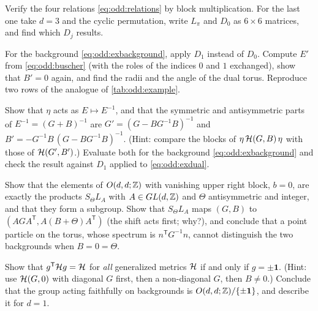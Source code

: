 \begin{exercise}\label{ex:odd:relations}
Verify the four relations \eqref{eq:odd:relations} by block multiplication. For the last
one take $d=3$ and the cyclic permutation, write $L_\pi$ and $D_0$ as $6\times6$
matrices, and find which $D_j$ results.
\end{exercise}

\begin{exercise}\label{ex:odd:table}
For the background \eqref{eq:odd:exbackground}, apply $D_1$ instead of $D_0$. Compute $E'$
from \eqref{eq:odd:buscher} (with the roles of the indices $0$ and $1$ exchanged), show
that $B'=0$ again, and find the radii and the angle of the dual torus. Reproduce two rows
of the analogue of \cref{tab:odd:example}.
\end{exercise}

\begin{exercise}\label{ex:odd:Einv}
Show that $\eta$ acts as $E\mapsto E^{-1}$, and that the symmetric and antisymmetric parts
of $E^{-1}=(G+B)^{-1}$ are $G'=(G-BG^{-1}B)^{-1}$ and $B'=-G^{-1}B\,(G-BG^{-1}B)^{-1}$.
(Hint: compare the blocks of $\eta\,\mathcal{H}(G,B)\,\eta$ with those of $\mathcal{H}(G',B')$.) Evaluate
both for the background \eqref{eq:odd:exbackground} and check the result against
$D_1$ applied to \eqref{eq:odd:exdual}.
\end{exercise}

\begin{exercise}\label{ex:odd:geometric}
Show that the elements of $O(d,d;\mathbb{Z})$ with vanishing upper right block, $b=0$, are exactly
the products $S_\Theta L_A$ with $A\in GL(d,\mathbb{Z})$ and $\Theta$ antisymmetric and integer, and
that they form a subgroup. Show that $S_\Theta L_A$ maps $(G,B)$ to
$(AGA^{\mathsf T},A(B+\Theta)A^{\mathsf T})$ (the shift acts first; why?), and conclude that a point particle on the torus,
whose spectrum is $n^{\mathsf T}G^{-1}n$, cannot distinguish the two backgrounds when
$B=0=\Theta$.
\end{exercise}

\begin{exercise}\label{ex:odd:trivial}
Show that $g^{\mathsf T}\mathcal{H} g=\mathcal{H}$ for \emph{all} generalized metrics $\mathcal{H}$ if and only if
$g=\pm\mathbf 1$. (Hint: use $\mathcal{H}(G,0)$ with diagonal $G$ first, then a non-diagonal $G$,
then $B\neq0$.) Conclude that the group acting faithfully on backgrounds is
$O(d,d;\mathbb{Z})/\{\pm\mathbf 1\}$, and describe it for $d=1$.
\end{exercise}

